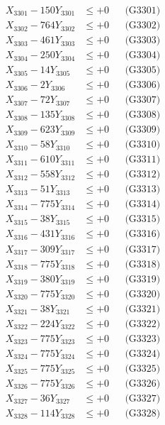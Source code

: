 \documentclass[a4paper,10pt]{article}
\begin{document}
{\begin{align}
\allowbreak
X_{3301} - 150Y_{3301} &\leq +0 && \text{(G3301)} \\
X_{3302} - 764Y_{3302} &\leq +0 && \text{(G3302)} \\
X_{3303} - 461Y_{3303} &\leq +0 && \text{(G3303)} \\
X_{3304} - 250Y_{3304} &\leq +0 && \text{(G3304)} \\
X_{3305} - 14Y_{3305} &\leq +0 && \text{(G3305)} \\
X_{3306} - 2Y_{3306} &\leq +0 && \text{(G3306)} \\
X_{3307} - 72Y_{3307} &\leq +0 && \text{(G3307)} \\
X_{3308} - 135Y_{3308} &\leq +0 && \text{(G3308)} \\
X_{3309} - 623Y_{3309} &\leq +0 && \text{(G3309)} \\
X_{3310} - 58Y_{3310} &\leq +0 && \text{(G3310)} \\
\allowbreak
X_{3311} - 610Y_{3311} &\leq +0 && \text{(G3311)} \\
X_{3312} - 558Y_{3312} &\leq +0 && \text{(G3312)} \\
X_{3313} - 51Y_{3313} &\leq +0 && \text{(G3313)} \\
X_{3314} - 775Y_{3314} &\leq +0 && \text{(G3314)} \\
X_{3315} - 38Y_{3315} &\leq +0 && \text{(G3315)} \\
X_{3316} - 431Y_{3316} &\leq +0 && \text{(G3316)} \\
X_{3317} - 309Y_{3317} &\leq +0 && \text{(G3317)} \\
X_{3318} - 775Y_{3318} &\leq +0 && \text{(G3318)} \\
X_{3319} - 380Y_{3319} &\leq +0 && \text{(G3319)} \\
X_{3320} - 775Y_{3320} &\leq +0 && \text{(G3320)} \\
\allowbreak
X_{3321} - 38Y_{3321} &\leq +0 && \text{(G3321)} \\
X_{3322} - 224Y_{3322} &\leq +0 && \text{(G3322)} \\
X_{3323} - 775Y_{3323} &\leq +0 && \text{(G3323)} \\
X_{3324} - 775Y_{3324} &\leq +0 && \text{(G3324)} \\
X_{3325} - 775Y_{3325} &\leq +0 && \text{(G3325)} \\
X_{3326} - 775Y_{3326} &\leq +0 && \text{(G3326)} \\
X_{3327} - 36Y_{3327} &\leq +0 && \text{(G3327)} \\
X_{3328} - 114Y_{3328} &\leq +0 && \text{(G3328)} \\

\end{align}}
\end{document}
